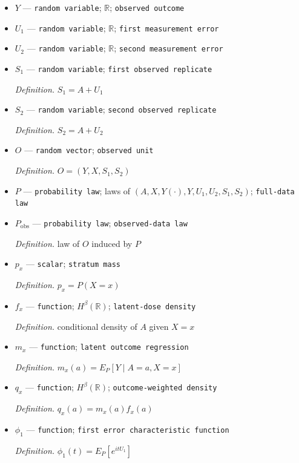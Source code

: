 \documentclass{article}
\begin{document}
\begin{itemize}
  \item \(Y\) --- \texttt{random variable}; \(\mathbb R\); \texttt{observed outcome}
  \item \(U_1\) --- \texttt{random variable}; \(\mathbb R\); \texttt{first measurement error}
  \item \(U_2\) --- \texttt{random variable}; \(\mathbb R\); \texttt{second measurement error}
  \item \(S_1\) --- \texttt{random variable}; \texttt{first observed replicate}
  \par\smallskip\noindent\emph{Definition.} \(S_1=A+U_1\)
  \item \(S_2\) --- \texttt{random variable}; \texttt{second observed replicate}
  \par\smallskip\noindent\emph{Definition.} \(S_2=A+U_2\)
  \item \(O\) --- \texttt{random vector}; \texttt{observed unit}
  \par\smallskip\noindent\emph{Definition.} \(O=(Y,X,S_1,S_2)\)
  \item \(P\) --- \texttt{probability law}; laws of \((A,X,Y(\cdot),Y,U_1,U_2,S_1,S_2)\); \texttt{full-\allowbreak{}data law}
  \item \(P_{\mathrm{obs}}\) --- \texttt{probability law}; \texttt{observed-\allowbreak{}data law}
  \par\smallskip\noindent\emph{Definition.} law of \(O\) induced by \(P\)
  \item \(p_x\) --- \texttt{scalar}; \texttt{stratum mass}
  \par\smallskip\noindent\emph{Definition.} \(p_x=P(X=x)\)
  \item \(f_x\) --- \texttt{function}; \(H^{\beta}(\mathbb R)\); \texttt{latent-\allowbreak{}dose density}
  \par\smallskip\noindent\emph{Definition.} conditional density of \(A\) given \(X=x\)
  \item \(m_x\) --- \texttt{function}; \texttt{latent outcome regression}
  \par\smallskip\noindent\emph{Definition.} \(m_x(a)=E_P[Y\mid A=a,X=x]\)
  \item \(q_x\) --- \texttt{function}; \(H^{\beta}(\mathbb R)\); \texttt{outcome-\allowbreak{}weighted density}
  \par\smallskip\noindent\emph{Definition.} \(q_x(a)=m_x(a)f_x(a)\)
  \item \(\phi_1\) --- \texttt{function}; \texttt{first error characteristic function}
  \par\smallskip\noindent\emph{Definition.} \(\phi_1(t)=E_P[e^{itU_1}]\)

\end{itemize}
\end{document}
